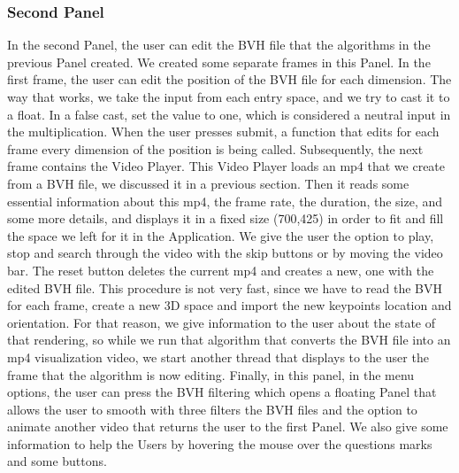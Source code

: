 \subsubsection*{Second Panel}
In the second Panel, the user can edit the BVH file that the algorithms in the previous Panel created. We created some separate frames in this Panel. In the first frame, the user can edit the position of the BVH file for each dimension. The way that works, we take the input from each entry space, and we try to cast it to a float. In a false cast, set the value to one, which is considered a neutral input in the multiplication. When the user presses submit, a function that edits for each frame every dimension of the position is being called. Subsequently, the next frame contains the Video Player. This Video  Player loads an mp4 that we create from a BVH file, we discussed it in a previous section. Then it reads some essential information about this mp4, the frame rate, the duration, the size, and some more details, and displays it in a fixed size (700,425) in order to fit and fill the space we left for it in the Application. We give the user the option to play, stop and search through the video with the skip buttons or by moving the video bar. The reset button deletes the current mp4 and creates a new, one with the edited BVH file. This procedure is not very fast, since we have to read the BVH for each frame, create a new 3D space and import the new keypoints location and orientation. For that reason, we give information to the user about the state of that rendering, so while we run that algorithm that converts the BVH file into an mp4 visualization video, we start another thread that displays to the user the frame that the algorithm is now editing. Finally, in this panel, in the menu options, the user can press the BVH filtering which opens a floating Panel that allows the user to smooth with three filters the BVH files and the option to animate another video that returns the user to the first Panel. We also give some information to help the Users by hovering the mouse over the questions marks and some buttons. 

\pagebreak

